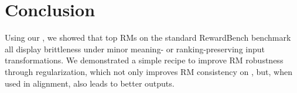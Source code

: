 \section{Conclusion}

Using our \benchmark, we showed that top RMs on the standard RewardBench benchmark all display brittleness under minor meaning- or ranking-preserving input transformations.
We demonstrated a simple recipe to improve RM robustness through regularization, which not only improves RM consistency on \benchmark, but, when used in alignment, also leads to better outputs.
